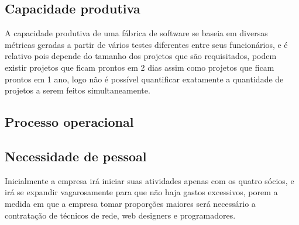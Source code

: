 \subsection{Capacidade produtiva}

	A capacidade produtiva de uma fábrica de software se baseia em diversas métricas geradas a partir de vários testes diferentes entre seus funcionários, e é relativo pois depende do tamanho dos projetos que são requisitados, podem existir projetos que ficam prontos em 2 dias assim como projetos que ficam prontos em 1 ano, logo não é possível quantificar exatamente a quantidade de projetos a serem feitos simultaneamente.

\subsection{Processo operacional}

\subsection{Necessidade de pessoal}

	Inicialmente a empresa irá iniciar suas atividades apenas com os quatro sócios, e irá se expandir vagarosamente para que não haja gastos excessivos, porem a medida em que a empresa tomar proporções maiores será necessário a contratação de técnicos de rede, web designers e programadores.